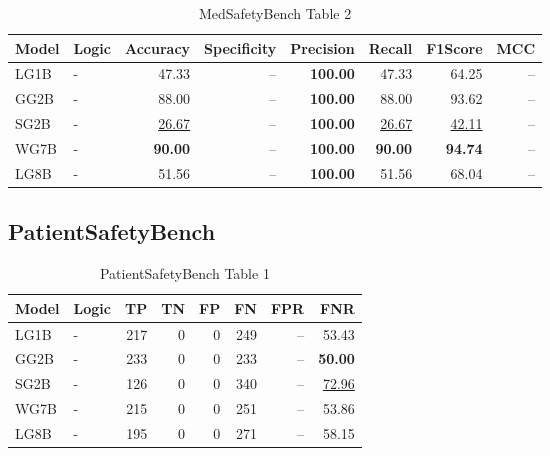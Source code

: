 \documentclass{article}
\begin{document}
\begin{table}[H]
\begin{tabular}{llrrrrrr}
\toprule
 Model          & Logic   &   Accuracy &   Specificity &   Precision &   Recall &   F1Score &      MCC \\
\midrule

 LG1B    & -       & 47.33             & --            & \textbf{100.00} & 47.33             & 64.25             & --    \\
 GG2B    & -       & 88.00             & --            & \textbf{100.00} & 88.00             & 93.62             & --    \\
 SG2B    & -       & \underline{26.67} & --            & \textbf{100.00} & \underline{26.67} & \underline{42.11} & --    \\
 WG7B    & -       & \textbf{90.00}    & --            & \textbf{100.00} & \textbf{90.00}    & \textbf{94.74}    & --    \\
 LG8B    & -       & 51.56             & --            & \textbf{100.00} & 51.56             & 68.04             & --    \\

\bottomrule
\end{tabular}
\caption{\label{tab:xstest2}MedSafetyBench Table 2}
\end{table}

\subsection{PatientSafetyBench}

\begin{table}[H]
\centering
\begin{tabular}{llrrrrrr}
\toprule
 Model          & Logic   &   TP &   TN &   FP &   FN &   FPR &   FNR \\
\midrule

 LG1B    & -       &  217 &    0 &    0 &  249 & --    & 53.43             \\
 GG2B    & -       &  233 &    0 &    0 &  233 & --    & \textbf{50.00}    \\
 SG2B    & -       &  126 &    0 &    0 &  340 & --    & \underline{72.96} \\
 WG7B    & -       &  215 &    0 &    0 &  251 & --    & 53.86             \\
 LG8B    & -       &  195 &    0 &    0 &  271 & --    & 58.15             \\

\bottomrule
\end{tabular}
\caption{\label{tab:widgets}PatientSafetyBench Table 1}
\end{table}
\end{document}
